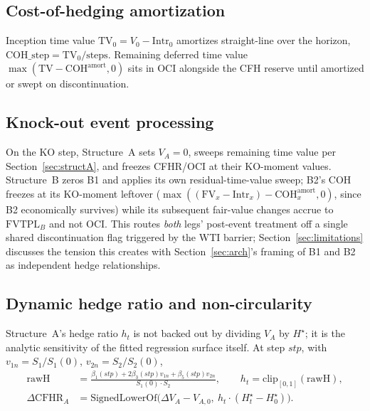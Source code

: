 \documentclass[11pt,a4paper]{article}
\begin{document}
\subsection{Cost-of-hedging amortization}
\label{sec:coh}

Inception time value $\mathrm{TV}_0=V_0-\mathrm{Intr}_0$ amortizes straight-line over the horizon, $\mathrm{COH\_step}=\mathrm{TV}_0/\text{steps}$. Remaining deferred time value $\max(\mathrm{TV}-\mathrm{COH}^{\mathrm{amort}},0)$ sits in OCI alongside the CFH reserve until amortized or swept on discontinuation.

\subsection{Knock-out event processing}
\label{sec:ko}

On the KO step, Structure~A sets $V_A=0$, sweeps remaining time value per Section~\ref{sec:structA}, and freezes CFHR/OCI at their KO-moment values. Structure~B zeros B1 and applies its own residual-time-value sweep; B2's COH freezes at its KO-moment leftover ($\max((\mathrm{FV}_x-\mathrm{Intr}_x)-\mathrm{COH}^{\mathrm{amort}}_x,0)$, since B2 economically survives) while its subsequent fair-value changes accrue to $\mathrm{FVTPL}_B$ and not OCI. This routes \emph{both} legs' post-event treatment off a single shared discontinuation flag triggered by the WTI barrier; Section~\ref{sec:limitations} discusses the tension this creates with Section~\ref{sec:arch}'s framing of B1 and B2 as independent hedge relationships.

\subsection{Dynamic hedge ratio and non-circularity}
\label{sec:ht}

Structure~A's hedge ratio $h_t$ is not backed out by dividing $V_A$ by $H^\star$; it is the analytic sensitivity of the fitted regression surface itself. At step $stp$, with $v_{1n}=S_1/S_1(0)$, $v_{2n}=S_2/S_2(0)$,
\begin{align}
\mathrm{rawH} &= \frac{\beta_1(stp)+2\beta_3(stp)v_{1n}+\beta_5(stp)v_{2n}}{S_1(0)\cdot S_2}, \qquad h_t = \mathrm{clip}_{[0,1]}(\mathrm{rawH}), \\
\Delta\mathrm{CFHR}_A &= \mathrm{SignedLowerOf}\big(\Delta V_A-V_{A,0},\ h_t\cdot(H^\star_t-H^\star_0)\big). \label{eq:cfhr}
\end{align}
\end{document}
